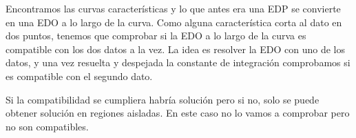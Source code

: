 \begin{example}{8}
		Encontramos las curvas características y lo que antes era una EDP se convierte en una EDO a lo largo de la curva. Como alguna característica corta al dato en dos puntos, tenemos que comprobar si la EDO a lo largo de la curva es compatible con los dos datos a la vez. La idea es resolver la EDO con uno de los datos, y una vez resuelta y despejada la constante de integración comprobamos si es compatible con el segundo dato.

		Si la compatibilidad se cumpliera habría solución pero si no, solo se puede obtener solución en regiones aisladas. En este caso no lo vamos a comprobar pero no son compatibles.



	\end{example}
